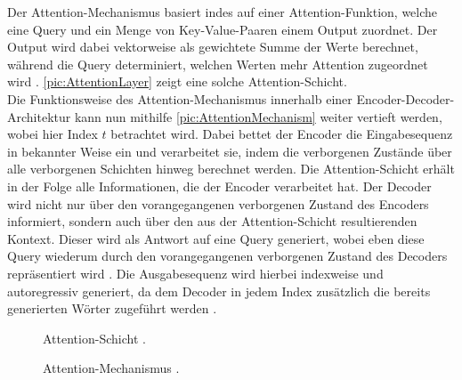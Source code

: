 \noindent
Der Attention-Mechanismus basiert indes auf einer Attention-Funktion, welche eine Query und ein Menge von Key-Value-Paaren einem Output zuordnet. Der Output wird dabei vektorweise als gewichtete Summe der Werte berechnet, während die Query determiniert, welchen Werten mehr Attention zugeordnet wird \cite{VAS17}. \autoref{pic:AttentionLayer} zeigt eine solche Attention-Schicht.\\

\noindent
Die Funktionsweise des Attention-Mechanismus innerhalb einer Encoder-Decoder-Architektur kann nun mithilfe \autoref{pic:AttentionMechanism} weiter vertieft werden, wobei hier Index $t$ betrachtet wird. Dabei bettet der Encoder die Eingabesequenz in bekannter Weise ein und verarbeitet sie, indem die verborgenen Zustände über alle verborgenen Schichten hinweg berechnet werden. Die Attention-Schicht erhält in der Folge alle Informationen, die der Encoder verarbeitet hat. Der Decoder wird nicht nur über den vorangegangenen verborgenen Zustand des Encoders informiert, sondern auch über den aus der Attention-Schicht resultierenden Kontext. Dieser wird als Antwort auf eine Query generiert, wobei eben diese Query wiederum durch den vorangegangenen verborgenen Zustand des Decoders repräsentiert wird \cite[S.~394]{ZHA20}. Die Ausgabesequenz wird hierbei indexweise und autoregressiv generiert, da dem Decoder in jedem Index zusätzlich die bereits generierten Wörter zugeführt werden \cite{VAS17}.\\

\begin{figure}[h!]
  \centering
  \caption{Attention-Schicht \cite[S.~390]{ZHA20}.}
  \label{pic:AttentionLayer}
\end{figure}

\begin{figure}[h!]
  \centering
  \caption{Attention-Mechanismus \cite[S.~394]{ZHA20}.}
  \label{pic:AttentionMechanism}
\end{figure}


